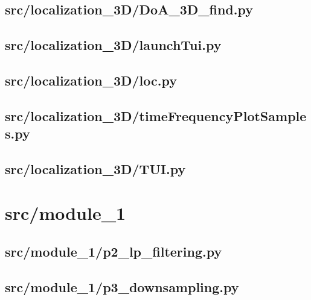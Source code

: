\subsection*{src/localization\_3D/DoA\_3D\_find.py}
\label{ap:DoA_3D_find}

\subsection*{src/localization\_3D/launchTui.py}
\label{ap:launchTui}

\subsection*{src/localization\_3D/loc.py}
\label{ap:loc}

\subsection*{src/localization\_3D/timeFrequencyPlotSamples.py}
\label{ap:timeFrequencyPlotSamples}

\subsection*{src/localization\_3D/TUI.py}
\label{ap:localization_3D-TUI}
\section{src/module\_1}

\subsection*{src/module\_1/p2\_lp\_filtering.py}
\label{ap:p2_lp_filtering}

\subsection*{src/module\_1/p3\_downsampling.py}
\label{ap:p3_downsampling}

